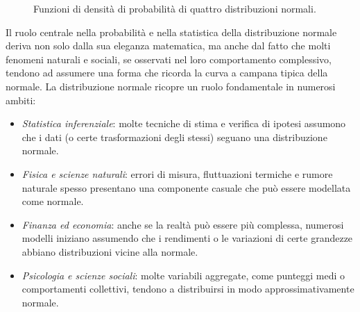 \documentclass[a4paper, 12pt]{report}
\begin{document}
    \begin{figure}[H]
        \centering

        \caption{Funzioni di densità di probabilità di quattro distribuzioni normali.}
    \end{figure}

    Il ruolo centrale nella probabilità e nella statistica della distribuzione normale deriva non solo dalla sua eleganza matematica, ma anche dal fatto che molti fenomeni naturali e sociali, se osservati nel loro comportamento complessivo, tendono ad assumere una forma che ricorda la curva a campana tipica della normale. La distribuzione normale ricopre un ruolo fondamentale in numerosi ambiti:
    \begin{itemize}
        \item \textit{Statistica inferenziale}: molte tecniche di stima e verifica di ipotesi assumono che i dati (o certe trasformazioni degli stessi) seguano una distribuzione normale.

        \item \textit{Fisica e scienze naturali}: errori di misura, fluttuazioni termiche e rumore naturale spesso presentano una componente casuale che può essere modellata come normale.

        \item \textit{Finanza ed economia}: anche se la realtà può essere più complessa, numerosi modelli iniziano assumendo che i rendimenti o le variazioni di certe grandezze abbiano distribuzioni vicine alla normale.

        \item \textit{Psicologia e scienze sociali}: molte variabili aggregate, come punteggi medi o comportamenti collettivi, tendono a distribuirsi in modo approssimativamente normale.
    \end{itemize}
\end{document}
